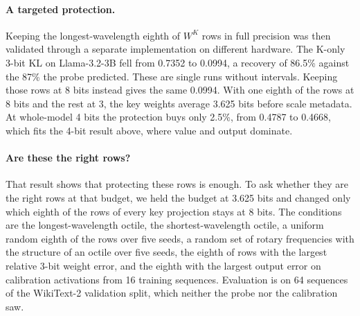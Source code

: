 \documentclass[10pt]{article}
\begin{document}
\paragraph{A targeted protection.} Keeping the longest-wavelength eighth of $W^K$ rows in full
precision was then validated through a separate implementation on different hardware. The K-only
3-bit KL on Llama-3.2-3B fell from 0.7352 to 0.0994, a recovery of 86.5\% against the 87\% the
probe predicted. These are single runs without intervals. Keeping those rows at 8 bits instead gives the same 0.0994. With one eighth of
the rows at 8 bits and the rest at 3, the key weights average 3.625 bits before scale metadata.
At whole-model 4 bits the protection buys only 2.5\%, from 0.4787 to 0.4668, which fits the
4-bit result above, where value and output dominate.

\paragraph{Are these the right rows?} That result shows that protecting these rows is enough. To
ask whether they are the right rows at that budget, we held the budget at 3.625 bits and changed
only which eighth of the rows of every key projection stays at 8 bits. The conditions are the
longest-wavelength octile, the shortest-wavelength octile, a uniform random eighth of the rows
over five seeds, a random set of rotary frequencies with the structure of an octile over five
seeds, the eighth of rows with the largest relative 3-bit weight error, and the eighth with the
largest output error on calibration activations from 16 training sequences. Evaluation is on 64
sequences of the WikiText-2 validation split, which neither the probe nor the calibration saw.
\end{document}
